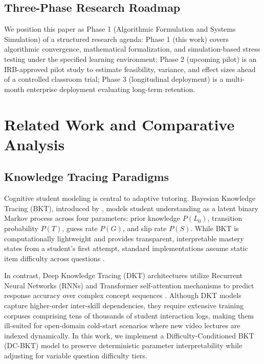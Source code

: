 \documentclass[pdflatex,sn-apa]{sn-jnl}
\begin{document}
\subsection{Three-Phase Research Roadmap}\label{sec1.3}

We position this paper as Phase 1 (Algorithmic Formulation and Systems Simulation) of a structured research agenda: Phase 1 (this work) covers algorithmic convergence, mathematical formalization, and simulation-based stress testing under the specified learning environment; Phase 2 (upcoming pilot) is an IRB-approved pilot study to estimate feasibility, variance, and effect sizes ahead of a controlled classroom trial; Phase 3 (longitudinal deployment) is a multi-month enterprise deployment evaluating long-term retention.

\section{Related Work and Comparative Analysis}\label{sec2}

\subsection{Knowledge Tracing Paradigms}\label{sec2.1}

Cognitive student modeling is central to adaptive tutoring. Bayesian Knowledge Tracing (BKT), introduced by \citet{corbett1994knowledge}, models student understanding as a latent binary Markov process across four parameters: prior knowledge $P(L_0)$, transition probability $P(T)$, guess rate $P(G)$, and slip rate $P(S)$. While BKT is computationally lightweight and provides transparent, interpretable mastery states from a student's first attempt, standard implementations assume static item difficulty across questions \citep{baker2008more,yudelson2013individualized}.

In contrast, Deep Knowledge Tracing (DKT) architectures utilize Recurrent Neural Networks (RNNs) and Transformer self-attention mechanisms to predict response accuracy over complex concept sequences \citep{piech2015deep}. Although DKT models capture higher-order inter-skill dependencies, they require extensive training corpuses comprising tens of thousands of student interaction logs, making them ill-suited for open-domain cold-start scenarios where new video lectures are indexed dynamically. In this work, we implement a Difficulty-Conditioned BKT (DC-BKT) model to preserve deterministic parameter interpretability while adjusting for variable question difficulty tiers.
\end{document}
